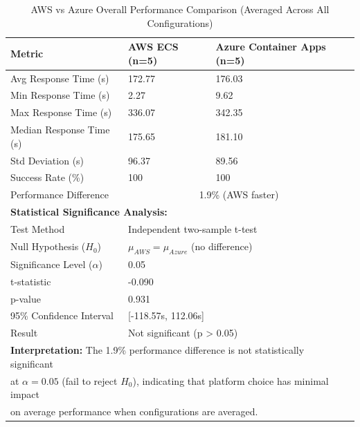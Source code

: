\begin{table}[!htbp]
\centering
\caption{AWS vs Azure Overall Performance Comparison (Averaged Across All Configurations)}
\label{tab:platform_comparison} 
\begin{tabular}{lll}
\toprule
\textbf{Metric} & \textbf{AWS ECS (n=5)} & \textbf{Azure Container Apps (n=5)} \\
\midrule
Avg Response Time (s) & 172.77 & 176.03 \\
Min Response Time (s) & 2.27 & 9.62 \\
Max Response Time (s) & 336.07 & 342.35 \\
Median Response Time (s) & 175.65 & 181.10 \\
Std Deviation (s) & 96.37 & 89.56 \\
Success Rate (\%) & 100 & 100 \\
\midrule
Performance Difference & \multicolumn{2}{c}{1.9\% (AWS faster)} \\
\midrule
\multicolumn{3}{l}{\textbf{Statistical Significance Analysis:}} \\
Test Method & \multicolumn{2}{l}{Independent two-sample t-test} \\
Null Hypothesis ($H_0$) & \multicolumn{2}{l}{$\mu_{AWS} = \mu_{Azure}$ (no difference)} \\
Significance Level ($\alpha$) & \multicolumn{2}{l}{0.05} \\
t-statistic & \multicolumn{2}{l}{-0.090} \\
p-value & \multicolumn{2}{l}{0.931} \\
95\% Confidence Interval & \multicolumn{2}{l}{[-118.57s, 112.06s]} \\
Result & \multicolumn{2}{l}{Not significant (p > 0.05)} \\
\bottomrule
\multicolumn{3}{l}{\footnotesize \textbf{Interpretation:} The 1.9\% performance difference is not statistically significant} \\
\multicolumn{3}{l}{\footnotesize at $\alpha=0.05$ (fail to reject $H_0$), indicating that platform choice has minimal impact} \\
\multicolumn{3}{l}{\footnotesize on average performance when configurations are averaged.} \\
\end{tabular}
\end{table}

